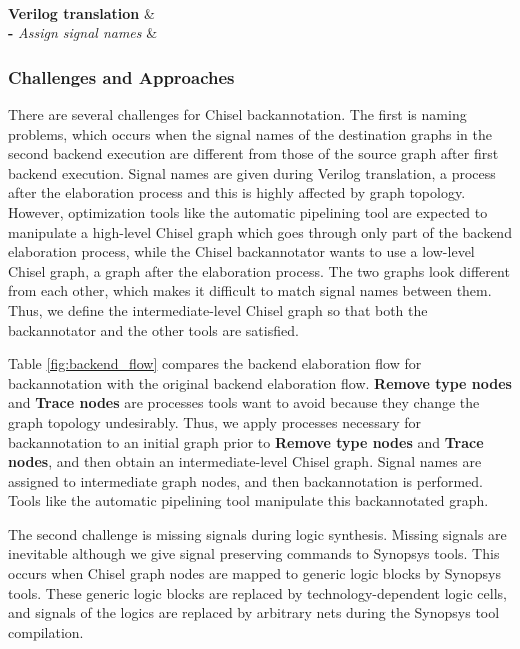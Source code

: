 \begin{table*}
\begin{tabular}
		 \\
		\hline
		{\bf Verilog translation} & \\
		{\bf -} \emph{Assign signal names} & \\
		\hline
	\end{tabular}
	\caption{Comparison between the original backend elaboration flow and the backend elaboration flow for backannotation. Note that signal names are assigned to intermediate-level Chisel graph nodes in the backannotation backend while they are given during Verilog translation in the original backend.}
	\label{fig:backend_flow}
\end{table*}

\subsubsection{Challenges and Approaches} 
\label{sec:challenges}
There are several challenges for Chisel backannotation. The first is naming problems, which occurs when the signal names of the destination graphs in the second backend execution are different from those of the source graph after first backend execution. Signal names are given during Verilog translation, a process after the elaboration process and this is highly affected by graph topology. However, optimization tools like the automatic pipelining tool are expected to manipulate a high-level Chisel graph which goes through only part of the backend elaboration process, while the Chisel backannotator wants to use a low-level Chisel graph, a graph after the elaboration process. The two graphs look different from each other, which makes it difficult to match signal names between them. Thus, we define the intermediate-level Chisel graph so that both the backannotator and the other tools are satisfied.

Table \ref{fig:backend_flow} compares the backend elaboration flow for backannotation with the original backend elaboration flow. \textbf{Remove type nodes} and \textbf{Trace nodes} are processes tools want to avoid because they change the graph topology undesirably. Thus, we apply processes necessary for backannotation to an initial graph prior to \textbf{Remove type nodes} and \textbf{Trace nodes}, and then obtain an intermediate-level Chisel graph. Signal names are assigned to intermediate graph nodes, and then backannotation is performed. Tools like the automatic pipelining tool manipulate this backannotated graph.

The second challenge is missing signals during logic synthesis. Missing signals are inevitable although we give signal preserving commands to Synopsys tools. This occurs when Chisel graph nodes are mapped to generic logic blocks by Synopsys tools. These generic logic blocks are replaced by technology-dependent logic cells, and signals of the logics are replaced by arbitrary nets during the Synopsys tool compilation.


